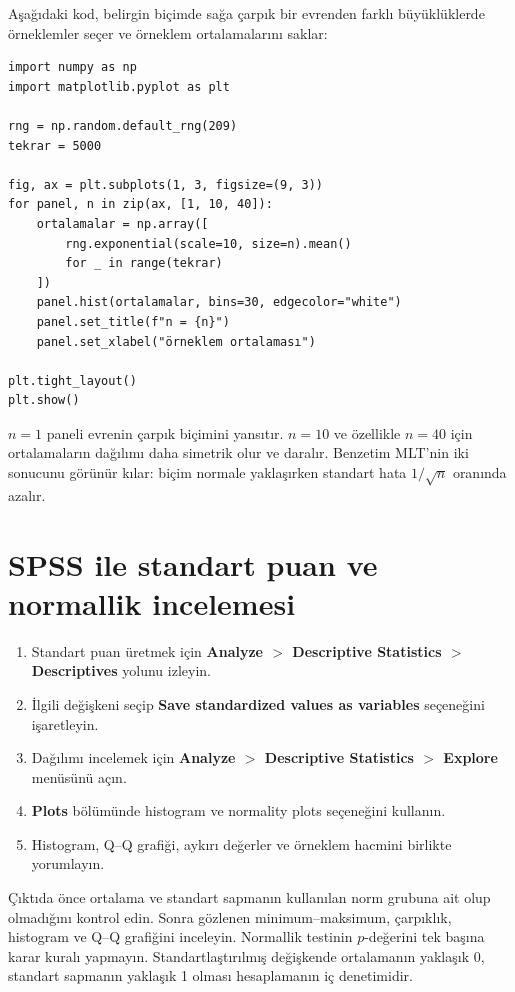 Aşağıdaki kod, belirgin biçimde sağa çarpık bir evrenden farklı büyüklüklerde
örneklemler seçer ve örneklem ortalamalarını saklar:

\begin{lstlisting}
import numpy as np
import matplotlib.pyplot as plt

rng = np.random.default_rng(209)
tekrar = 5000

fig, ax = plt.subplots(1, 3, figsize=(9, 3))
for panel, n in zip(ax, [1, 10, 40]):
    ortalamalar = np.array([
        rng.exponential(scale=10, size=n).mean()
        for _ in range(tekrar)
    ])
    panel.hist(ortalamalar, bins=30, edgecolor="white")
    panel.set_title(f"n = {n}")
    panel.set_xlabel("örneklem ortalaması")

plt.tight_layout()
plt.show()
\end{lstlisting}

$n=1$ paneli evrenin çarpık biçimini yansıtır. $n=10$ ve özellikle $n=40$
için ortalamaların dağılımı daha simetrik olur ve daralır. Benzetim MLT'nin
iki sonucunu görünür kılar: biçim normale yaklaşırken standart hata
$1/\sqrt n$ oranında azalır.

\section{SPSS ile standart puan ve normallik incelemesi}

\begin{enumerate}
  \item Standart puan üretmek için \textbf{Analyze $>$ Descriptive Statistics $>$ Descriptives} yolunu izleyin.
  \item İlgili değişkeni seçip \textbf{Save standardized values as variables} seçeneğini işaretleyin.
  \item Dağılımı incelemek için \textbf{Analyze $>$ Descriptive Statistics $>$ Explore} menüsünü açın.
  \item \textbf{Plots} bölümünde histogram ve normality plots seçeneğini kullanın.
  \item Histogram, Q--Q grafiği, aykırı değerler ve örneklem hacmini birlikte yorumlayın.
\end{enumerate}

\begin{outputguidebox}
Çıktıda önce ortalama ve standart sapmanın kullanılan norm grubuna ait olup
olmadığını kontrol edin. Sonra gözlenen minimum--maksimum, çarpıklık, histogram
ve Q--Q grafiğini inceleyin. Normallik testinin $p$-değerini tek başına karar
kuralı yapmayın. Standartlaştırılmış değişkende ortalamanın yaklaşık 0,
standart sapmanın yaklaşık 1 olması hesaplamanın iç denetimidir.
\end{outputguidebox}

